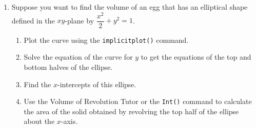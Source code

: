 \begin{enumerate}
    \clearpage
    \item Suppose you want to find the volume of an egg that has an elliptical shape defined in the $xy$-plane by $\dfrac{x^2}{2}+y^2=1$.
    \begin{enumerate}
        \item Plot the curve using the \texttt{implicitplot()} command.
        \item Solve the equation of the curve for $y$ to get the equations of the top and bottom halves of the ellipse.
        \item Find the $x$-intercepts of this ellipse.
        \item Use the Volume of Revolution Tutor or the \texttt{Int()} command to calculate the area of the solid obtained by revolving the top half of the ellipse about the $x$-axis.
    \end{enumerate}
\end{enumerate}